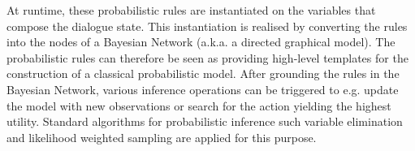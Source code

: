 At runtime, these probabilistic rules are instantiated on the variables that compose the dialogue state.  This instantiation is realised by converting the rules into the nodes of a Bayesian Network (a.k.a. a directed graphical model).  The probabilistic rules can therefore be seen as providing high-level templates for the construction of a classical probabilistic model.  After grounding the rules in the Bayesian Network, various inference operations can be triggered to e.g. update the model with new observations or search for the action yielding the highest utility.  Standard algorithms for probabilistic inference such variable elimination \citep{ZhangP96} and likelihood weighted sampling \citep{FungC89} are applied for this purpose.

